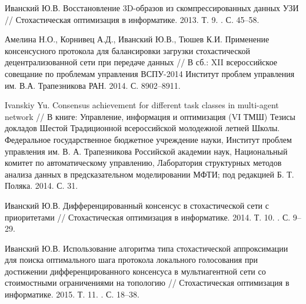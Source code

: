 \documentclass{spisok-article}
\newcommand*{\No}{\textnumero}
\begin{document}
\begin{thebibliography}{11}
Иванский Ю.В.
Восстановление 3D-образов из скомпрессированных данных УЗИ //
Стохастическая оптимизация в информатике. 2013. Т. 9. \No 1. С. 45--58.

Амелина Н.О., Корнивец А.Д., Иванский Ю.В., Тюшев К.И.
Применение консенсусного протокола для балансировки загрузки стохастической децентрализованной сети при передаче данных //
В сб.: XII всероссийское совещание по проблемам управления ВСПУ-2014 Институт проблем управления им. В.А. Трапезникова РАН. 2014. С. 8902--8911.

Ivanskiy Yu.
Consensus achievement for different task classes in multi-agent network //
В книге: Управление, информация и оптимизация (VI ТМШ) Тезисы докладов Шестой Традиционной всероссийской молодежной летней Школы. Федеральное государственное бюджетное учреждение науки, Институт проблем управления им. В. А. Трапезникова Российской академии наук, Национальный комитет по автоматическому управлению, Лаборатория структурных методов анализа данных в предсказательном моделировании МФТИ; под редакцией Б. Т. Поляка. 2014. С. 31.

Иванский Ю.В.
Дифференцированный консенсус в стохастической сети с приоритетами //
Стохастическая оптимизация в информатике. 2014. Т. 10. \No 1. С. 9--29.

Иванский Ю.В.
Использование алгоритма типа стохастической аппроксимации для поиска оптимального шага протокола локального голосования при достижении дифференцированного консенсуса в мультиагентной сети со стоимостными ограничениями на топологию //
Стохастическая оптимизация в информатике. 2015. Т. 11. \No 3. С. 18--38.

\end{thebibliography}
\end{document}
